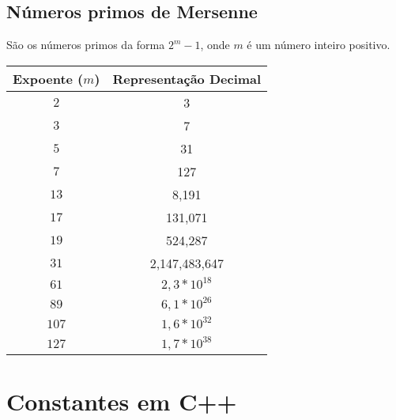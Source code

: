 \subsection{Números primos de Mersenne}

São os números primos da forma $2^m - 1$, onde $m$ é um número inteiro positivo.

\begin{table}[h]
  \centering
  \begin{tabular}{|c|c|}
    \hline
    \textbf{Expoente ($m$)} & \textbf{Representação Decimal} \\
    \hline
    \(2\) & 3 \\
    \hline
    \(3\) & 7 \\
    \hline
    \(5\) & 31 \\
    \hline
    \(7\) & 127 \\
    \hline
    \(13\) & 8,191 \\
    \hline
    \(17\) & 131,071 \\
    \hline
    \(19\) & 524,287 \\
    \hline
    \(31\) & 2,147,483,647 \\
    \hline
    \(61\) & $2,3 * 10^{18}$ \\
    \hline
    \(89\) & $6,1 * 10^{26}$ \\
    \hline
    \(107\) & $1,6 * 10^{32}$ \\
    \hline
    \(127\) & $1,7 * 10^{38}$ \\
    \hline
  \end{tabular}
\end{table}


\section{Constantes em C++}

